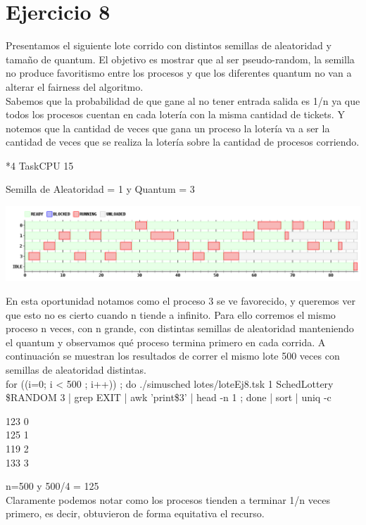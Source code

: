 \section{Ejercicio 8}

Presentamos el siguiente lote corrido con distintos semillas de aleatoridad y tamaño de quantum.
El objetivo es mostrar que al ser pseudo-random, la semilla no produce favoritismo entre los procesos y que los diferentes quantum no van a alterar el fairness del algoritmo.\\
Sabemos que la probabilidad de que gane al no tener entrada salida es 1/n ya que todos los procesos cuentan en cada lotería con la misma cantidad de tickets.
Y notemos que la cantidad de veces que gana un proceso la lotería va a ser la cantidad de veces que se realiza la lotería sobre la cantidad de procesos corriendo.
\begin {center}
*4 TaskCPU 15\\
\end {center}

Semilla de Aleatoridad = 1 y Quantum = 3
\begin {center}
\includegraphics[width=16cm]{../simusched/outputs/ej8/sl-ej8-1-3.png}
\end {center}
En esta oportunidad notamos como el proceso 3 se ve favorecido, y queremos ver que esto no es cierto cuando n tiende a infinito. Para ello corremos el mismo proceso n veces, con n grande, con distintas semillas
de aleatoridad manteniendo el quantum y observamos qué proceso termina primero en cada corrida.
A continuación se muestran los resultados de correr el mismo lote 500 veces con semillas de aleatoridad distintas.\\
for ((i=0; i < 500 ; i++)) ; do ./simusched lotes/loteEj8.tsk 1 SchedLottery \$RANDOM 3 | grep EXIT | awk '{print\$3}' | head -n 1 ; done | sort | uniq -c\\
\begin {center}   
    123 0\\
    125 1\\
    119 2\\
    133 3\\
\end {center}   
n=500 y 500/4 = 125\\
Claramente podemos notar como los procesos tienden a terminar 1/n veces primero, es decir, obtuvieron de forma equitativa el recurso.

